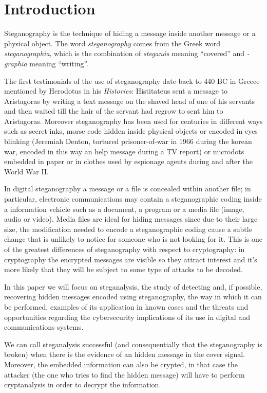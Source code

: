 \documentclass[../../main.tex]{subfiles}
\begin{document}
\section{Introduction}

Steganography is the technique of hiding a message inside another message or a
physical object.
The word \textit{steganography} comes from the Greek word
\textit{steganographia}, which is the combination of \textit{steganós} meaning
``covered'' and \textit{-graphia} meaning ``writing''.

The first testimonials of the use of steganography date back to 440 BC in Greece
mentioned by Herodotus in his \emph{Histories}: Histitateus sent a message to
Aristagoras by writing a text message on the shaved head of one of his servants
and then waited till the hair of the servant had regrow to sent him to
Aristagoras.
Moreover steganography has been used for centuries in different ways such as
secret inks, morse code hidden inside physical objects or encoded in eyes
blinking (Jeremiah Denton, tortured prisoner-of-war in 1966 during the korean
war, encoded in this way an help message during a TV report) or microdots
embedded in paper or in clothes used by espionage agents during and after the
World War II.

In digital steganography a message or a file is concealed within another file;
in particular, electronic communications may contain a steganographic coding
inside a information vehicle such as a document, a program or a media file
(image, audio or video).
Media files are ideal for hiding messages since due to their large size, the
modification needed to encode a steganographic coding cause a subtle change that
is unlikely to notice for someone who is not looking for it.
This is one of the greatest differences of steganography with respect to
cryptography: in cryptography the encrypted messages are visible so they attract
interest and it's more likely that they will be subject to some type of attacks
to be decoded.

In this paper we will focus on steganalysis, the study of detecting and, if
possible, recovering hidden messages encoded using steganography, the way in
which it can be performed, examples of its application in known cases and
the threats and opportunities regarding the cybersecurity implications of its
use in digital and communications systems.

We can call steganalysis successful (and consequentially that the steganography
is broken) when there is the evidence of an hidden message in the cover signal.
Moreover, the embedded information can also be crypted, in that case the
attacker (the one who tries to find the hidden message) will have to perform
cryptanalysis in order to decrypt the information.

\pagebreak
\end{document}
